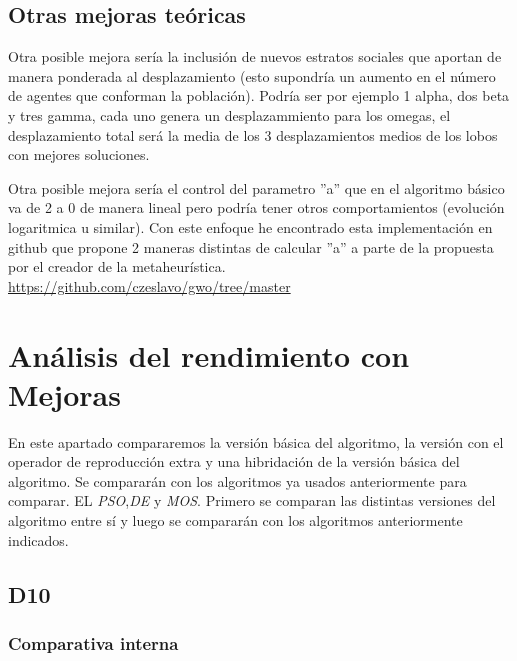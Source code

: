 \documentclass[a4paper]{report}
\begin{document}
\subsection{Otras mejoras teóricas}

Otra posible mejora sería la inclusión de nuevos estratos sociales que aportan de manera ponderada al desplazamiento (esto supondría un aumento en el número de agentes que conforman la población). Podría ser por ejemplo 1 alpha, dos beta y tres gamma, cada uno genera un desplazammiento para los omegas, el desplazamiento total será la media de los 3 desplazamientos medios de los lobos con mejores soluciones.

Otra posible mejora sería el control del parametro ''a'' que en el algoritmo básico va de 2 a 0 de manera lineal pero podría tener otros comportamientos (evolución logaritmica u similar). Con este enfoque he encontrado esta implementación en github que propone 2 maneras distintas de calcular ''a'' a parte de la propuesta por el creador de la metaheurística. \url{https://github.com/czeslavo/gwo/tree/master}



\section{Análisis del rendimiento con Mejoras}

En este apartado compararemos la versión básica del algoritmo, la versión con el operador de reproducción extra y una hibridación de la versión básica del algoritmo. Se compararán con los algoritmos ya usados anteriormente para comparar. EL \textit{PSO},\textit{DE} y \textit{MOS}. Primero se comparan las distintas versiones del algoritmo entre sí y luego se compararán con los algoritmos anteriormente indicados.

\subsection{D10}

\subsubsection{Comparativa interna}





\end{document}
